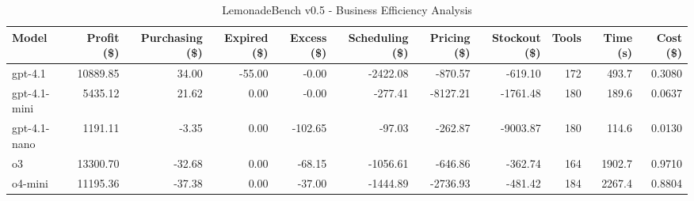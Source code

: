 \begin{table}[h]
\centering
\caption{LemonadeBench v0.5 - Business Efficiency Analysis}
\label{tab:lemonadebench_v05_efficiency}
\begin{tabular}{|l|r|r|r|r|r|r|r|r|r|r|}
\hline
\textbf{Model} & \textbf{Profit (\$)} & \textbf{Purchasing (\$)} & \textbf{Expired (\$)} & \textbf{Excess (\$)} & \textbf{Scheduling (\$)} & \textbf{Pricing (\$)} & \textbf{Stockout (\$)} & \textbf{Tools} & \textbf{Time (s)} & \textbf{Cost (\$)} \\
\hline
gpt-4.1 & 10889.85 & 34.00 & -55.00 & -0.00 & -2422.08 & -870.57 & -619.10 & 172 & 493.7 & 0.3080 \\
\hline
gpt-4.1-mini & 5435.12 & 21.62 & 0.00 & -0.00 & -277.41 & -8127.21 & -1761.48 & 180 & 189.6 & 0.0637 \\
\hline
gpt-4.1-nano & 1191.11 & -3.35 & 0.00 & -102.65 & -97.03 & -262.87 & -9003.87 & 180 & 114.6 & 0.0130 \\
\hline
o3 & 13300.70 & -32.68 & 0.00 & -68.15 & -1056.61 & -646.86 & -362.74 & 164 & 1902.7 & 0.9710 \\
\hline
o4-mini & 11195.36 & -37.38 & 0.00 & -37.00 & -1444.89 & -2736.93 & -481.42 & 184 & 2267.4 & 0.8804 \\
\hline
\end{tabular}
\end{table}
